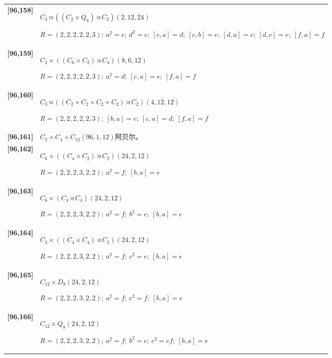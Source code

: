 \documentclass[UTF8,fontset=fandol,11pt,a4paper]{ctexart}
\begin{document}
\begin{longtable}{@{}p{17mm}>{\raggedright\arraybackslash}p{141mm}@{}}
\textbf{[96,158]} & $C_{3}\rtimes ((C_{2}\times Q_{8})\rtimes C_{2})$\quad $(2,12,24)$\par\(R=(2,2,2,2,2,3);\allowbreak\ a^{2}=e;\allowbreak\ d^{2}=e;\allowbreak\ [c,a]=d;\allowbreak\ [c,b]=e;\allowbreak\ [d,a]=e;\allowbreak\ [d,c]=e;\allowbreak\ [f,a]=f\)\\[3pt]

\textbf{[96,159]} & $C_{2}\times ((C_{6}\times C_{2})\rtimes C_{4})$\quad $(8,6,12)$\par\(R=(2,2,2,2,2,3);\allowbreak\ a^{2}=d;\allowbreak\ [c,a]=e;\allowbreak\ [f,a]=f\)\\[3pt]

\textbf{[96,160]} & $C_{3}\rtimes ((C_{2}\times C_{2}\times C_{2}\times C_{2})\rtimes C_{2})$\quad $(4,12,12)$\par\(R=(2,2,2,2,2,3);\allowbreak\ [b,a]=e;\allowbreak\ [c,a]=d;\allowbreak\ [f,a]=f\)\\[3pt]

\textbf{[96,161]} & $C_{2}\times C_{4}\times C_{12}$\quad $(96,1,12)$\quad 阿贝尔。\\[3pt]

\textbf{[96,162]} & $C_{6}\times ((C_{4}\times C_{2})\rtimes C_{2})$\quad $(24,2,12)$\par\(R=(2,2,2,3,2,2);\allowbreak\ a^{2}=f;\allowbreak\ [b,a]=e\)\\[3pt]

\textbf{[96,163]} & $C_{6}\times (C_{4}\rtimes C_{4})$\quad $(24,2,12)$\par\(R=(2,2,2,3,2,2);\allowbreak\ a^{2}=f;\allowbreak\ b^{2}=e;\allowbreak\ [b,a]=e\)\\[3pt]

\textbf{[96,164]} & $C_{3}\times ((C_{4}\times C_{4})\rtimes C_{2})$\quad $(24,2,12)$\par\(R=(2,2,2,3,2,2);\allowbreak\ a^{2}=f;\allowbreak\ c^{2}=e;\allowbreak\ [b,a]=e\)\\[3pt]

\textbf{[96,165]} & $C_{12}\times D_{8}$\quad $(24,2,12)$\par\(R=(2,2,2,3,2,2);\allowbreak\ a^{2}=f;\allowbreak\ c^{2}=f;\allowbreak\ [b,a]=e\)\\[3pt]

\textbf{[96,166]} & $C_{12}\times Q_{8}$\quad $(24,2,12)$\par\(R=(2,2,2,3,2,2);\allowbreak\ a^{2}=f;\allowbreak\ b^{2}=e;\allowbreak\ c^{2}=ef;\allowbreak\ [b,a]=e\)\\[3pt]


\end{longtable}
\end{document}
